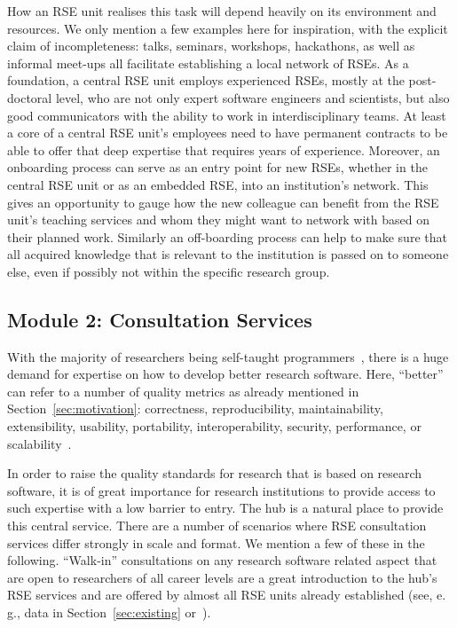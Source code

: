 \documentclass[10pt,letterpaper]{article}
\newcommand*{\eg}{e.\,g.,\xspace}
\begin{document}
How an RSE unit realises this task will depend heavily on its environment and resources.
We only mention a few examples here for inspiration, with the explicit claim of incompleteness:
talks, seminars, workshops, hackathons, as well as informal meet-ups all facilitate establishing a local network of RSEs.
As a foundation, a central RSE unit employs experienced RSEs, mostly at the post-doctoral level, who are not only expert software engineers and scientists, but also good communicators with the ability to work in interdisciplinary teams.
At least a core of a central RSE unit's employees need to have permanent contracts to be able to offer that deep expertise that requires years of experience.
Moreover, an onboarding process can serve as an entry point for new RSEs, whether in the central RSE unit or as an embedded RSE, into an institution's network.
This gives an opportunity to gauge how the new colleague can benefit from the RSE unit's teaching services and whom they might want to network with based on their planned work.
Similarly an off-boarding process can help to make sure that all acquired knowledge that is relevant to the institution is passed on to someone else, even if possibly not within the specific research group.

\subsection*{Module 2: Consultation Services}%
\label{sec:consultation}

With the majority of researchers being self-taught programmers~\autocite{Carver2013}, there is a huge demand for expertise on how to develop better research software.
Here, “better” can refer to a number of quality metrics as already mentioned in Section~\ref{sec:motivation}: correctness, reproducibility, maintainability, extensibility, usability, portability, interoperability, security, performance, or scalability~\autocite[Chapter 16]{Schulmeyer2008}.

In order to raise the quality standards for research that is based on research software, it is of great importance for research institutions to provide access to such expertise with a low barrier to entry.
The hub is a natural place to provide this central service.
There are a number of scenarios where RSE consultation services differ strongly in scale and format.
We mention a few of these in the following.
“Walk-in” consultations on any research software related aspect that are open to researchers of all career levels are a great introduction to the hub's RSE services and are offered by almost all RSE units already established (see, \eg{} data in Section~\ref{sec:existing} or~\cite{Katz2019}).
\end{document}
